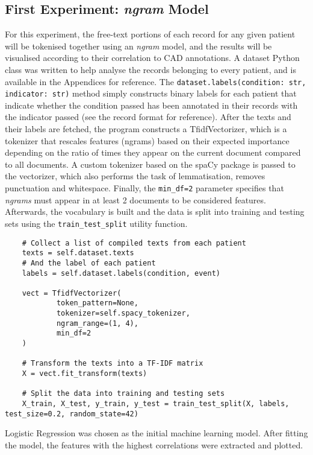 \documentclass[a4paper,12pt]{article}
\begin{document}
\subsection{First Experiment: \textit{n\-gram} Model}

For this experiment, the free-text portions of each record for any given
patient will be tokenised together using an \textit{n\-gram} model, and
the results will be visualised according to their correlation to CAD
annotations.
A dataset Python class was written to help analyse the records belonging
to every patient, and is available in the Appendices for reference.
The \texttt{dataset.labels(condition: str, indicator: str)}
method simply constructs binary labels for each patient that indicate
whether the condition passed has been annotated in their records with
the indicator passed (see the record format for reference).
After the texts and their labels are fetched, the program constructs
a TfidfVectorizer, which is a tokenizer that rescales features
(n\-grams) based on their expected importance depending on the ratio
of times they appear on the current document compared to all documents.
A custom tokenizer based on the spaCy package is passed to the vectorizer,
which also performs the task of lemmatisation, removes punctuation and
whitespace.
Finally, the \texttt{min_df=2} parameter specifies that
\textit{n\-grams} must appear in at least 2 documents to be considered
features.
Afterwards, the vocabulary is built and the data is split into training
and testing sets using the \texttt{train_test_split} utility
function.

\begin{verbatim}
    # Collect a list of compiled texts from each patient
    texts = self.dataset.texts
    # And the label of each patient
    labels = self.dataset.labels(condition, event)

    vect = TfidfVectorizer(
            token_pattern=None,
            tokenizer=self.spacy_tokenizer,
            ngram_range=(1, 4),
            min_df=2
    )

    # Transform the texts into a TF-IDF matrix
    X = vect.fit_transform(texts)

    # Split the data into training and testing sets
    X_train, X_test, y_train, y_test = train_test_split(X, labels, test_size=0.2, random_state=42)
\end{verbatim}

Logistic Regression was chosen as the initial machine learning model.
After fitting the model, the features with the highest correlations were
extracted and plotted.
\end{document}
